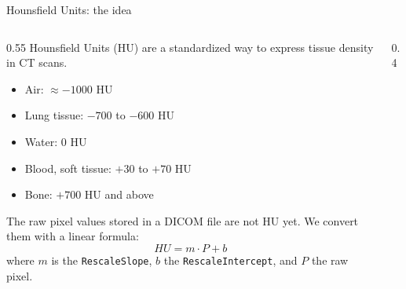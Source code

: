 \documentclass[10pt,aspectratio=169]{beamer}
\begin{document}
\begin{frame}{Hounsfield Units: the idea}
\begin{columns}[T,onlytextwidth]
\begin{column}{0.55\textwidth}
Hounsfield Units (HU) are a standardized way to express tissue density in CT scans.
\begin{itemize}
  \item Air: $\approx -1000$ HU
  \item Lung tissue: $-700$ to $-600$ HU
  \item Water: $0$ HU
  \item Blood, soft tissue: $+30$ to $+70$ HU
  \item Bone: $+700$ HU and above
\end{itemize}
The raw pixel values stored in a DICOM file are not HU yet. We convert them with a linear formula:
\[
  HU = m \cdot P + b
\]
where $m$ is the \texttt{RescaleSlope}, $b$ the \texttt{RescaleIntercept}, and $P$ the raw pixel.
\end{column}
\begin{column}{0.4\textwidth}
\centering
{}
\end{column}
\end{columns}
\end{frame}
\end{document}
